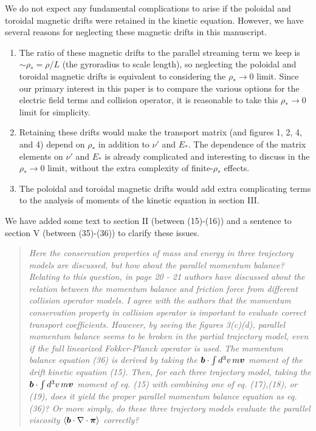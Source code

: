\documentclass[11pt]{article}
\newcommand{\vect}[1]{\mbox{\boldmath $#1$}}
\newcommand{\todo}[1]{{\color{red}#1}}
\newenvironment{referee}{\begin{quote}\it\color{Blue}}{\end{quote}}
\begin{document}
We do not expect any fundamental complications to arise if the poloidal and toroidal magnetic drifts
were retained in the kinetic equation. 
However, we have several reasons for neglecting these magnetic drifts
 in this manuscript.
\begin{enumerate}
\item The ratio of these magnetic drifts to the parallel streaming term we keep is $\sim \rho_* = \rho / L$
 (the gyroradius to scale length), so neglecting the poloidal and toroidal magnetic drifts is
equivalent to considering the $\rho_* \to 0$ limit.
Since our primary interest in this paper is to compare the various options for the electric field
terms and collision operator, it is reasonable to take this $\rho_* \to 0$ limit for simplicity.
\item
Retaining these drifts would make the transport matrix (and figures 1, 2, 4, and 4)
depend on $\rho_*$ in addition to $\nu'$ and $E_*$. 
The dependence of the matrix elements on $\nu'$ and $E_*$ is already  complicated
and interesting to discuss in the $\rho_* \to 0$ limit,
without the extra complexity of finite-$\rho_*$ effects.
\item The poloidal and toroidal magnetic drifts would add extra complicating
terms to the analysis of moments of the kinetic equation in section III.
\end{enumerate}

We have added some text to section II (between (15)-(16)) and a sentence to section V (between \todo{(35)-(36)}) to clarify these issues.

\begin{referee}
Here the conservation properties of mass and energy in three trajectory models are discussed,
but how about the parallel momentum balance? Relating to this question, in page 20 - 21
authors have discussed about the relation between the momentum balance and friction force
from different collision operator models. I agree with the authors that the momentum
conservation property in collision operator is important to evaluate correct transport coefficients.
However, by seeing the figures 3(c)(d), parallel momentum balance seems to be broken in the
partial trajectory model, even if the full linearized Fokker-Planck operator is used.
The momentum balance equation (36) is derived by taking the $\vect{b}\cdot \int d^3v\, m\vect{v}$ moment of the drift
kinetic equation (15). Then, for each three trajectory model, taking the $\vect{b}\cdot \int d^3v\, m\vect{v}$ moment of
eq. (15) with combining one of eq. (17),(18), or (19), does it yield the proper parallel momentum
balance equation as eq.(36)? Or more simply, do these three trajectory models evaluate the
parallel viscosity $\left<\vect{b}\cdot\nabla\cdot\vect{\pi}\right>$ correctly?
\end{referee}
\end{document}
